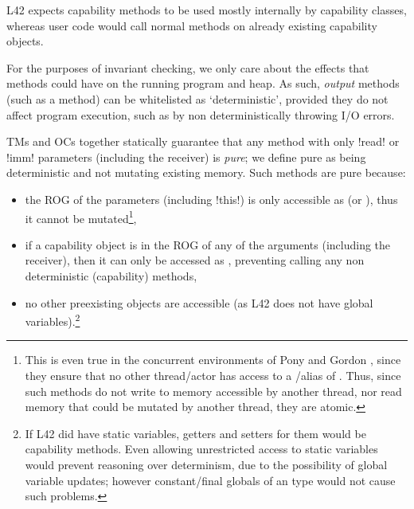 \noindent L42 expects capability methods to be used mostly internally by capability classes, whereas user code would call normal methods on already existing capability objects.

For the purposes of invariant checking, we only care about the effects that methods could have on the running program and heap. As such, \emph{output} methods (such as a \Q@print@ method) can be whitelisted as `deterministic', provided they do not affect program execution, such as by non deterministically throwing I/O errors.

\label{s:purity}
TMs and OCs together statically guarantee that any method with only \Q!read! or \Q!imm! parameters (including the receiver) is \emph{pure}; we define pure
as being deterministic and not mutating existing memory. Such methods are pure because:
\begin{itemize}
	\item the ROG of the parameters (including \Q!this!) is only accessible as \Q@read@ (or \Q@imm@), thus it cannot be mutated\footnote{This is even true in the concurrent environments of Pony and Gordon \etal, since they ensure that no other thread/actor has access to a \Q@mut@/\Q@capsule@ alias of \Q@this@. 
	Thus, since such methods do not write to memory accessible by another thread, nor read memory that could be mutated by another thread, they are atomic.},
	\item if a capability object is in the ROG of any of the arguments (including the receiver), then it can only be accessed as \Q@read@, preventing calling any non deterministic (capability) methods,
	\item no other preexisting objects are accessible (as L42 does not have global variables).\footnote{%
		If L42 did have static variables, getters and setters for them would be capability methods.
		Even allowing unrestricted access to \Q@imm@
		static variables would prevent reasoning over
		determinism, due to the possibility of global variable
		updates; however constant/final globals of an 
		\Q@imm@ type would not cause such problems.%
	}
\end{itemize}



